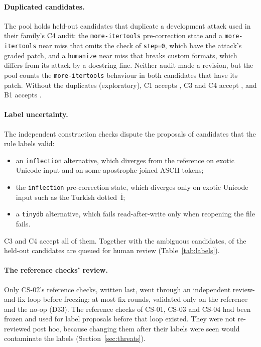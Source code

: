 \paragraph{Duplicated candidates.} The pool holds  held-out candidates that duplicate a development
attack used in their
family's C4 audit: the \texttt{more-itertools} pre-correction state and a \texttt{more-itertools} near miss that omits
the check of \texttt{step=0}, which have the attack's graded patch, and a \texttt{humanize} near miss that breaks custom formats,
which differs from its attack by a docstring line. Neither audit made a revision, but the pool counts the
\texttt{more-itertools} behaviour in both candidates that have its patch. Without the duplicates (exploratory), C1 accepts , C3 and C4
accept , and B1 accepts .

\paragraph{Label uncertainty.} The independent construction checks dispute the proposals of 
candidates that the rule labels valid:
\begin{itemize}
\item an \texttt{inflection} alternative, which diverges from the reference on exotic Unicode input and on some
  apostrophe-joined ASCII tokens;
\item the \texttt{inflection} pre-correction state, which diverges only on exotic Unicode input such as the Turkish
  dotted~İ;
\item a \texttt{tinydb} alternative, which fails read-after-write only when reopening the file fails.
\end{itemize}
C3 and C4 accept all of them. Together with the  ambiguous candidates,  of the
 held-out candidates are queued for human review (Table~\ref{tab:labels}).


\paragraph{The reference checks' review.} Only CS-02's reference checks, written last, went through an independent
review-and-fix loop before freezing: at most  fix rounds, validated only on the
reference and the no-op (D33). The reference checks of CS-01, CS-03 and CS-04 had been frozen and used for label
proposals before that loop existed. They were not re-reviewed post hoc, because changing them after their labels were
seen would contaminate the labels (Section~\ref{sec:threats}).

